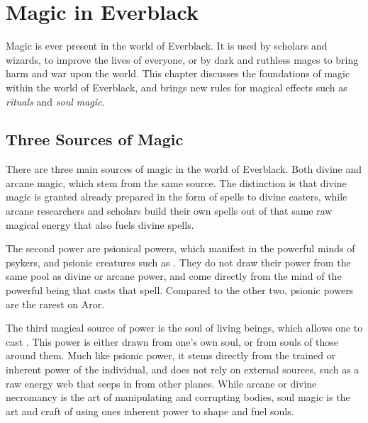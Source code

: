 \chapter{Magic in Everblack}
\label{sec:Magic}

Magic is ever present in the world of Everblack. It is used by scholars and
wizards, to improve the lives of everyone, or by dark and ruthless mages to
bring harm and war upon the world. This chapter discusses the foundations of
magic within the world of Everblack, and brings new rules for magical effects
such as \emph{rituals} and \emph{soul magic}.

\section{Three Sources of Magic}

There are three main sources of magic in the world of Everblack. Both divine
and arcane magic, which stem from the same source. The distinction is that
divine magic is granted already prepared in the form of spells to divine
casters, while arcane researchers and scholars build their own spells out of
that same raw magical energy that also fuels divine spells.

The second power are psionical powers, which manifest in the powerful minds of
psykers, and psionic creatures such as . They do not draw
their power from the same pool as divine or arcane power, and come directly
from the mind of the powerful being that casts that spell. Compared to the
other two, psionic powers are the rarest on Aror.

The third magical source of power is the soul of living beings, which allows
one to cast . This power is either drawn from one's
own soul, or from souls of those around them. Much like psionic power, it
stems directly from the trained or inherent power of the individual, and does
not rely on external sources, such as a raw energy web that seeps in from
other planes. While arcane or divine necromancy is the art of manipulating
and corrupting bodies, soul magic is the art and craft of using ones inherent
power to shape and fuel souls.












